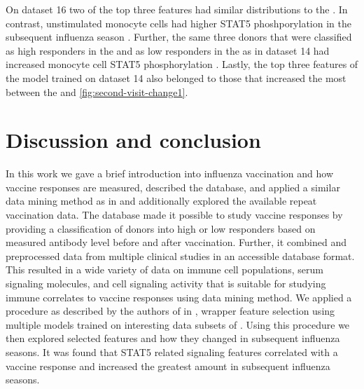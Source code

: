 On dataset 16 two of the top three features had similar distributions to the \firstvis {}.
In contrast, unstimulated monocyte cells had higher STAT5 phoshporylation in the subsequent influenza season .
Further, the same three donors that were classified as high responders in the \firstvis and as low responders in the \secondvis as in dataset 14  had increased monocyte cell STAT5 phosphorylation .
Lastly, the top three features of the model trained on dataset 14 also belonged to those that increased the most between the \firstvis and \secondvis \autoref{fig:second-visit-change1}.

\section{Discussion and conclusion}

In this work we gave a brief introduction into influenza vaccination and how vaccine responses are measured, described the \flup database, and applied a similar data mining method as in \spaper and additionally explored the available repeat vaccination data.
The \flup database made it possible to study vaccine responses by providing a classification of donors into high or low responders based on measured antibody level before and after vaccination.
Further, it combined and preprocessed data from multiple clinical studies in an accessible database format.
This resulted in a wide variety of data on immune cell populations, serum signaling molecules, and cell signaling activity that is suitable for studying immune correlates to vaccine responses using data mining method.
We applied a procedure as described by the authors of \flup in \spaper, wrapper feature selection using multiple models trained on interesting data subsets of \flup. Using this procedure we then explored selected features and how they changed in subsequent influenza seasons.
It was found that STAT5 related signaling features correlated with a vaccine response and increased the greatest amount in subsequent influenza seasons.

